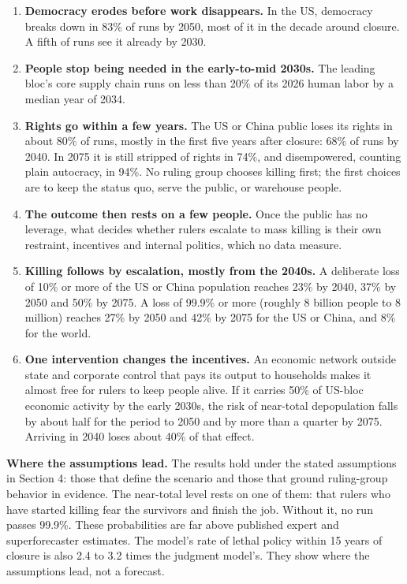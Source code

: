 \documentclass[
  10pt,
]{article}
\providecommand{\tightlist}{%
  \setlength{\itemsep}{0pt}\setlength{\parskip}{0pt}}
\begin{document}
\begin{enumerate}
\def\labelenumi{\arabic{enumi}.}
\tightlist
\item
  \textbf{Democracy erodes before work disappears.} In the US, democracy breaks down in 83\% of runs
  by 2050, most of it in the decade around closure. A fifth of runs see it already by 2030.
\item
  \textbf{People stop being needed in the early-to-mid 2030s.} The leading bloc's core supply chain
  runs on less than 20\% of its 2026 human labor by a median year of 2034.
\item
  \textbf{Rights go within a few years.} The US or China public loses its rights in about 80\% of
  runs, mostly in the first five years after closure: 68\% of runs by 2040. In 2075 it is still
  stripped of rights in 74\%, and disempowered, counting plain autocracy, in 94\%. No ruling group
  chooses killing first; the first choices are to keep the status quo, serve the public, or
  warehouse people.
\item
  \textbf{The outcome then rests on a few people.} Once the public has no leverage, what decides
  whether rulers escalate to mass killing is their own restraint, incentives and internal politics,
  which no data measure.
\item
  \textbf{Killing follows by escalation, mostly from the 2040s.} A deliberate loss of 10\% or more
  of the US or China population reaches 23\% by 2040, 37\% by 2050 and 50\% by 2075. A loss of
  99.9\% or more (roughly 8 billion people to 8 million) reaches 27\% by 2050 and 42\% by 2075 for
  the US or China, and 8\% for the world.
\item
  \textbf{One intervention changes the incentives.} An economic network outside state and corporate
  control that pays its output to households makes it almost free for rulers to keep people alive.
  If it carries 50\% of US-bloc economic activity by the early 2030s, the risk of near-total
  depopulation falls by about half for the period to 2050 and by more than a quarter by 2075.
  Arriving in 2040 loses about 40\% of that effect.
\end{enumerate}

\textbf{Where the assumptions lead.} The results hold under the stated assumptions in Section 4:
those that define the scenario and those that ground ruling-group behavior in evidence. The
near-total level rests on one of them: that rulers who have started killing fear the survivors and
finish the job. Without it, no run passes 99.9\%. These probabilities are far above published expert
and superforecaster estimates. The model's rate of lethal policy within 15 years of closure is also
2.4 to 3.2 times the judgment model's. They show where the assumptions lead, not a forecast.
\end{document}
